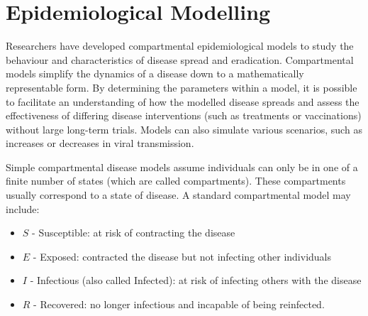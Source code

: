 \chapter{Epidemiological Modelling}

Researchers have developed compartmental epidemiological models to study the
behaviour and characteristics of disease spread and eradication. Compartmental
models simplify the dynamics of a disease down to a mathematically
representable form. By determining the parameters within a model, 
it is possible to facilitate an understanding of 
how the modelled disease spreads and assess the effectiveness of 
differing disease interventions (such as treatments or vaccinations) 
without large long-term trials. Models can also simulate various
scenarios, such as increases or decreases in viral transmission.

Simple compartmental disease models assume individuals can only be in one of
a finite number of states (which are called compartments). These compartments
usually correspond to a state of disease. A standard compartmental model may 
include: \begin{itemize}
    \item $S$ - Susceptible: at risk of contracting the disease
    \item $E$ - Exposed: contracted the disease but not infecting other
          individuals
    \item $I$ - Infectious (also called Infected): at risk of infecting others
          with the disease
    \item $R$ - Recovered: no longer infectious and incapable of being reinfected.
\end{itemize}

